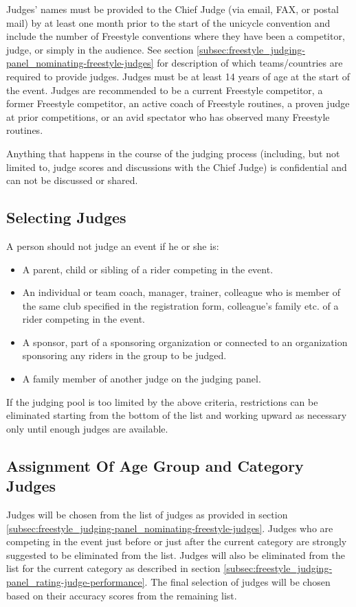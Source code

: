 Judges' names must be provided to the Chief Judge (via email, FAX, or postal mail) by at least one month prior to the start of the unicycle convention and include the number of Freestyle conventions where they have been a competitor, judge, or simply in the audience.%
See section \ref{subsec:freestyle_judging-panel_nominating-freestyle-judges} for description of which teams/countries are required to provide judges.
Judges must be at least 14 years of age at the start of the event.
Judges are recommended to be a current Freestyle competitor, a former Freestyle competitor, an active coach of Freestyle routines, a proven judge at prior competitions, or an avid spectator who has observed many Freestyle routines.

Anything that happens in the course of the judging process (including, but not limited to, judge scores and discussions with the Chief Judge) is confidential and can not be discussed or shared.

\subsection{Selecting Judges \label{subsec:freestyle_judging-panel_selecting-judges}}
A person should not judge an event if he or she is:
\begin{itemize}
\item A parent, child or sibling of a rider competing in the event.
\item An individual or team coach, manager, trainer, colleague who is member of the same club specified in the registration form, colleague's family etc.
of a rider competing in the event.
\item A sponsor, part of a sponsoring organization or connected to an organization sponsoring any riders in the group to be judged.
\item A family member of another judge on the judging panel.
\end{itemize}
If the judging pool is too limited by the above criteria, restrictions can be eliminated starting from the bottom of the list and working upward as necessary only until enough judges are available.

\subsection{Assignment Of Age Group and Category Judges}
Judges will be chosen from the list of judges as provided in section \ref{subsec:freestyle_judging-panel_nominating-freestyle-judges}.
Judges who are competing in the event just before or just after the current category are strongly suggested to be eliminated from the list.
Judges will also be eliminated from the list for the current category as described in section \ref{subsec:freestyle_judging-panel_rating-judge-performance}.
The final selection of judges will be chosen based on their accuracy scores from the remaining list.%

